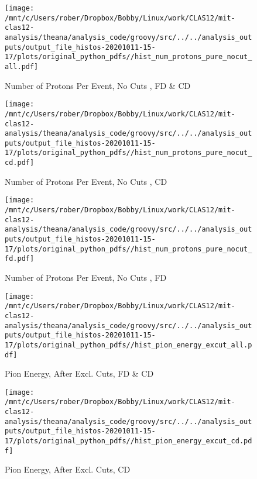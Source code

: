 \documentclass{article}
\begin{document}
\begin{landscape}
    \begin{figure}[h]
        \centering

        \texttt{[image: /mnt/c/Users/rober/Dropbox/Bobby/Linux/work/CLAS12/mit-clas12-analysis/theana/analysis\_code/groovy/src/../../analysis\_outputs/output\_file\_histos-20201011-15-17/plots/original\_python\_pdfs//hist\_num\_protons\_pure\_nocut\_all.pdf]}
        \captionsetup{textformat=empty,labelformat=blank}
        \caption{Number of Protons Per Event, No Cuts , FD \& CD}
    \end{figure}
    \clearpage
    
    \begin{figure}[h]
        \centering

        \texttt{[image: /mnt/c/Users/rober/Dropbox/Bobby/Linux/work/CLAS12/mit-clas12-analysis/theana/analysis\_code/groovy/src/../../analysis\_outputs/output\_file\_histos-20201011-15-17/plots/original\_python\_pdfs//hist\_num\_protons\_pure\_nocut\_cd.pdf]}
        \captionsetup{textformat=empty,labelformat=blank}
        \caption{Number of Protons Per Event, No Cuts , CD}
    \end{figure}
    \clearpage
    
    \begin{figure}[h]
        \centering

        \texttt{[image: /mnt/c/Users/rober/Dropbox/Bobby/Linux/work/CLAS12/mit-clas12-analysis/theana/analysis\_code/groovy/src/../../analysis\_outputs/output\_file\_histos-20201011-15-17/plots/original\_python\_pdfs//hist\_num\_protons\_pure\_nocut\_fd.pdf]}
        \captionsetup{textformat=empty,labelformat=blank}
        \caption{Number of Protons Per Event, No Cuts , FD}
    \end{figure}
    \clearpage
    
    \begin{figure}[h]
        \centering

        \texttt{[image: /mnt/c/Users/rober/Dropbox/Bobby/Linux/work/CLAS12/mit-clas12-analysis/theana/analysis\_code/groovy/src/../../analysis\_outputs/output\_file\_histos-20201011-15-17/plots/original\_python\_pdfs//hist\_pion\_energy\_excut\_all.pdf]}
        \captionsetup{textformat=empty,labelformat=blank}
        \caption{Pion Energy, After Excl. Cuts, FD \& CD}
    \end{figure}
    \clearpage
    
    \begin{figure}[h]
        \centering

        \texttt{[image: /mnt/c/Users/rober/Dropbox/Bobby/Linux/work/CLAS12/mit-clas12-analysis/theana/analysis\_code/groovy/src/../../analysis\_outputs/output\_file\_histos-20201011-15-17/plots/original\_python\_pdfs//hist\_pion\_energy\_excut\_cd.pdf]}
        \captionsetup{textformat=empty,labelformat=blank}
        \caption{Pion Energy, After Excl. Cuts, CD}
    \end{figure}
    \clearpage
    

\end{landscape}
\end{document}
